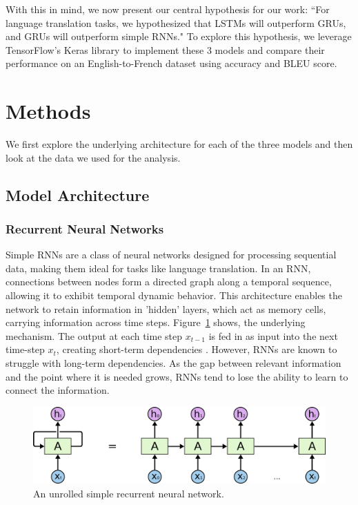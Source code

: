 \documentclass{article}
\begin{document}
With this in mind, we now present our central hypothesis for our work: ``For language translation tasks, we hypothesized that LSTMs will outperform GRUs, and GRUs will outperform simple RNNs." To explore this hypothesis, we leverage TensorFlow's Keras library to implement these 3 models and compare their performance on an English-to-French dataset using accuracy and BLEU score.


\section{Methods}

We first explore the underlying architecture for each 
of the three models and then look at the data we used for
the analysis. 

\subsection{Model Architecture}

\subsubsection{Recurrent Neural Networks}
 Simple RNNs are a class of neural networks designed for processing sequential data, making them ideal for tasks like language translation. In an RNN, connections between nodes form a directed graph along a temporal sequence, allowing it to exhibit temporal dynamic behavior. This architecture enables the network to retain information in 'hidden' layers, which act as memory cells, carrying information across time steps. Figure~\ref{simple-rnn} shows, the underlying mechanism. The output at each time step $x_{t-1}$ is fed in as input into the next time-step $x_{t}$, creating short-term dependencies \cite{Olah15}. However, RNNs are known to struggle with long-term dependencies. As the gap between relevant information and the point where it is needed grows, RNNs tend to lose the ability to learn to connect the information.

 \begin{figure}[ht]
\vskip 0.2in
\begin{center}
\centerline{\includegraphics[width=\columnwidth]{ML_images/RNN-unrolled.png}}
\caption{An unrolled simple recurrent neural network.}
\label{simple-rnn}
\end{center}
\vskip -0.2in
\end{figure}
\end{document}
